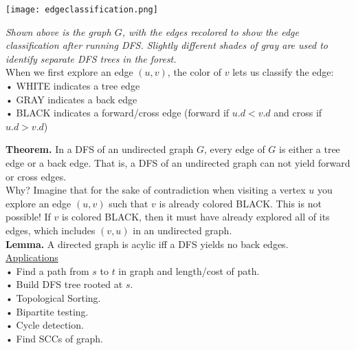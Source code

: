 \documentclass[12pt, fleqn]{general}
\begin{document}
\begin{multicols*}{2}
    \texttt{[image: edgeclassification.png]}

    \emph{Shown above is the graph $G$, with the edges recolored to show the edge classification after running DFS. Slightly different shades of gray are used to identify separate DFS trees in the forest.}\\

    When we first explore an edge $(u, v)$, the color of $v$ lets us classify the edge:\\

    • WHITE indicates a tree edge\\
    • GRAY indicates a back edge\\
    • BLACK indicates a forward/cross edge (forward if $u.d < v.d$ and cross if $u.d > v.d$)

    \textbf{Theorem.} In a DFS of an undirected graph $G$, every edge of $G$ is either a tree edge or a back edge. That is, a DFS of an undirected graph can not yield forward or cross edges.\\
    
    Why? Imagine that for the sake of contradiction when visiting a vertex $u$ you explore an edge $(u, v)$ such that $v$ is already colored BLACK. This is not possible! If $v$ is colored BLACK, then it must have already explored all of its edges, which includes $(v, u)$ in an
    undirected graph.\\

    \textbf{Lemma.} A directed graph is acylic iff a DFS yields no back edges.\\


    \underline{Applications}\\

    • Find a path from $s$ to $t$ in graph and length/cost of path.\\
    • Build DFS tree rooted at $s$.\\
    • Topological Sorting.\\
    • Bipartite testing.\\
    • Cycle detection.\\
    • Find SCCs of graph.\\


\end{multicols*}
\end{document}
